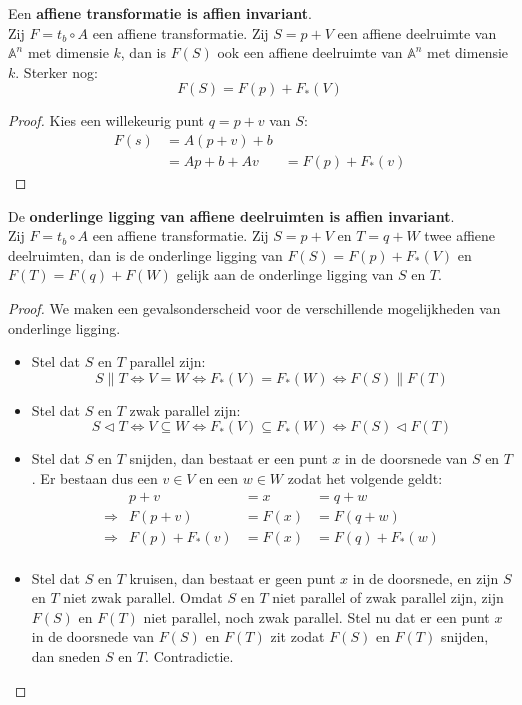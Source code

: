 \documentclass[main.tex]{subfiles}
\begin{document}
\begin{st}
  \label{st:affiene-transformatie-deelruimte-invariant}
  Een \textbf{affiene transformatie is affien invariant}.\\
  Zij $F = t_{b} \circ A$ een affiene transformatie.
  Zij $S = p+V$ een affiene deelruimte van $\mathbb{A}^{n}$ met dimensie $k$, dan is $F(S)$ ook een affiene deelruimte van $\mathbb{A}^{n}$ met dimensie $k$.
  Sterker nog:
  \[ F(S) = F(p) + F_{*}(V) \]

  \begin{proof}
    Kies een willekeurig punt $q= p+v$ van $S$:
    \[
    \begin{array}{rll}
    F(s) &= A(p+v) + b &\\
         &= Ap + b + Av &= F(p) + F_{*}(v)      
    \end{array}
    \]
  \end{proof}
\end{st}

\begin{st}
  De \textbf{onderlinge ligging van affiene deelruimten is affien invariant}.\\
  Zij $F = t_{b} \circ A$ een affiene transformatie.
  Zij $S= p+V$ en $T= q+W$ twee affiene deelruimten, dan is de onderlinge ligging van $F(S) = F(p) + F_{*}(V)$ en $F(T) = F(q) + F(W)$ gelijk aan de onderlinge ligging van $S$ en $T$.  

  \begin{proof}
    We maken een gevalsonderscheid voor de verschillende mogelijkheden van onderlinge ligging.
    \begin{itemize}
    \item Stel dat $S$ en $T$ parallel zijn:
      \[ S \parallel T \Leftrightarrow V = W \Leftrightarrow F_{*}(V)=F_{*}(W) \Leftrightarrow F(S) \parallel F(T) \]
    \item Stel dat $S$ en $T$ zwak parallel zijn:
      \[ S \triangleleft T \Leftrightarrow V \subseteq W \Leftrightarrow F_{*}(V)\subseteq F_{*}(W) \Leftrightarrow F(S) \triangleleft F(T) \]
    \item Stel dat $S$ en $T$ snijden, dan bestaat er een punt $x$ in de doorsnede van $S$ en $T$.
      Er bestaan dus een $v\in V$ en een $w \in W$ zodat het volgende geldt:
      \[
      \begin{array}{rrll}
                      & p + v  &= x   &= q + w\\
         \Rightarrow  & F(p+v) &=F(x) &= F(q+w)\\
         \Rightarrow  & F(p)+F_{*}(v) &= F(x) &= F(q)+F_{*}(w)\\
      \end{array}
      \]
    \item Stel dat $S$ en $T$ kruisen, dan bestaat er geen punt $x$ in de doorsnede, en zijn $S$ en $T$ niet zwak parallel.
      Omdat $S$ en $T$ niet parallel of zwak parallel zijn, zijn $F(S)$ en $F(T)$ niet parallel, noch zwak parallel.
      Stel nu dat er een punt $x$ in de doorsnede van $F(S)$ en $F(T)$ zit zodat $F(S)$ en $F(T)$ snijden, dan sneden $S$ en $T$.
      Contradictie.
    \end{itemize}
  \end{proof}
\end{st}
\end{document}
